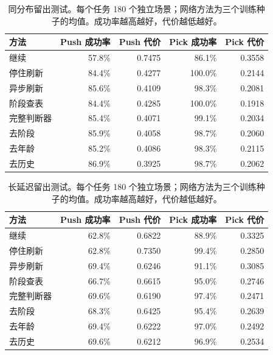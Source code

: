 \begin{table}[t]
\centering\small
\caption{同分布留出测试。每个任务 180 个独立场景；网络方法为三个训练种子的均值。成功率越高越好，代价越低越好。}\label{tab:test}
\begin{tabular}{lrrrr}\toprule
方法 & Push 成功率 & Push 代价 & Pick 成功率 & Pick 代价\\\midrule
继续 & 57.8\% & 0.7475 & 86.1\% & 0.3558\\
停住刷新 & 84.4\% & 0.4277 & 100.0\% & 0.2144\\
异步刷新 & 85.6\% & 0.4109 & 98.3\% & 0.2081\\
阶段查表 & 84.4\% & 0.4285 & 100.0\% & 0.1918\\
完整判断器 & 85.4\% & 0.4071 & 99.1\% & 0.2034\\
去阶段 & 85.9\% & 0.4058 & 98.7\% & 0.2060\\
去年龄 & 85.2\% & 0.4086 & 98.3\% & 0.2115\\
去历史 & 86.9\% & 0.3925 & 98.7\% & 0.2062\\
\bottomrule\end{tabular}
\end{table}
\begin{table}[t]
\centering\small
\caption{长延迟留出测试。每个任务 180 个独立场景；网络方法为三个训练种子的均值。成功率越高越好，代价越低越好。}\label{tab:delay}
\begin{tabular}{lrrrr}\toprule
方法 & Push 成功率 & Push 代价 & Pick 成功率 & Pick 代价\\\midrule
继续 & 62.8\% & 0.6822 & 88.9\% & 0.3325\\
停住刷新 & 62.8\% & 0.7350 & 99.4\% & 0.2850\\
异步刷新 & 69.4\% & 0.6246 & 91.1\% & 0.3085\\
阶段查表 & 66.7\% & 0.6615 & 95.0\% & 0.2746\\
完整判断器 & 69.6\% & 0.6190 & 97.4\% & 0.2471\\
去阶段 & 68.3\% & 0.6425 & 95.4\% & 0.2639\\
去年龄 & 69.4\% & 0.6222 & 97.0\% & 0.2492\\
去历史 & 69.6\% & 0.6212 & 96.9\% & 0.2534\\
\bottomrule\end{tabular}
\end{table}
